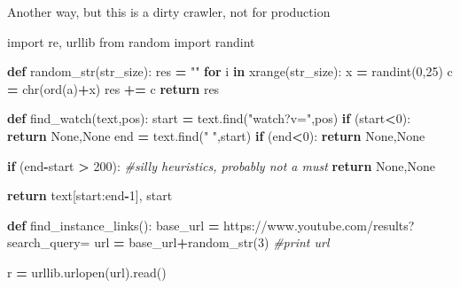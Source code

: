 \documentclass[
]{book}
\newenvironment{Shaded}{\begin{snugshade}}{\end{snugshade}}
\newcommand{\BuiltInTok}[1]{#1}
\newcommand{\CommentTok}[1]{\textcolor[rgb]{0.56,0.35,0.01}{\textit{#1}}}
\newcommand{\ControlFlowTok}[1]{\textcolor[rgb]{0.13,0.29,0.53}{\textbf{#1}}}
\newcommand{\DecValTok}[1]{\textcolor[rgb]{0.00,0.00,0.81}{#1}}
\newcommand{\ImportTok}[1]{#1}
\newcommand{\KeywordTok}[1]{\textcolor[rgb]{0.13,0.29,0.53}{\textbf{#1}}}
\newcommand{\NormalTok}[1]{#1}
\newcommand{\OperatorTok}[1]{\textcolor[rgb]{0.81,0.36,0.00}{\textbf{#1}}}
\newcommand{\StringTok}[1]{\textcolor[rgb]{0.31,0.60,0.02}{#1}}
\newcommand{\VariableTok}[1]{\textcolor[rgb]{0.00,0.00,0.00}{#1}}
\begin{document}
Another way, but this is a dirty crawler, not for production

\begin{Shaded}
\begin{Highlighting}[]
\ImportTok{import}\NormalTok{ re, urllib}
\ImportTok{from}\NormalTok{ random }\ImportTok{import}\NormalTok{ randint}

\KeywordTok{def}\NormalTok{ random\_str(str\_size):}
\NormalTok{    res }\OperatorTok{=} \StringTok{""}
    \ControlFlowTok{for}\NormalTok{ i }\KeywordTok{in} \BuiltInTok{xrange}\NormalTok{(str\_size):}
\NormalTok{        x }\OperatorTok{=}\NormalTok{ randint(}\DecValTok{0}\NormalTok{,}\DecValTok{25}\NormalTok{)}
\NormalTok{        c }\OperatorTok{=} \BuiltInTok{chr}\NormalTok{(}\BuiltInTok{ord}\NormalTok{(}\StringTok{\textquotesingle{}a\textquotesingle{}}\NormalTok{)}\OperatorTok{+}\NormalTok{x)}
\NormalTok{        res }\OperatorTok{+=}\NormalTok{ c}
    \ControlFlowTok{return}\NormalTok{ res}

\KeywordTok{def}\NormalTok{ find\_watch(text,pos):}
\NormalTok{    start }\OperatorTok{=}\NormalTok{ text.find(}\StringTok{"watch?v="}\NormalTok{,pos)}
    \ControlFlowTok{if}\NormalTok{ (start}\OperatorTok{\textless{}}\DecValTok{0}\NormalTok{):}
        \ControlFlowTok{return} \VariableTok{None}\NormalTok{,}\VariableTok{None}
\NormalTok{    end }\OperatorTok{=}\NormalTok{ text.find(}\StringTok{" "}\NormalTok{,start)}
    \ControlFlowTok{if}\NormalTok{ (end}\OperatorTok{\textless{}}\DecValTok{0}\NormalTok{):}
        \ControlFlowTok{return} \VariableTok{None}\NormalTok{,}\VariableTok{None}

    \ControlFlowTok{if}\NormalTok{ (end}\OperatorTok{{-}}\NormalTok{start }\OperatorTok{\textgreater{}} \DecValTok{200}\NormalTok{): }\CommentTok{\#silly heuristics, probably not a must}
        \ControlFlowTok{return} \VariableTok{None}\NormalTok{,}\VariableTok{None}

    \ControlFlowTok{return}\NormalTok{ text[start:end}\OperatorTok{{-}}\DecValTok{1}\NormalTok{], start}


\KeywordTok{def}\NormalTok{ find\_instance\_links():}
\NormalTok{    base\_url }\OperatorTok{=} \StringTok{\textquotesingle{}https://www.youtube.com/results?search\_query=\textquotesingle{}}
\NormalTok{    url }\OperatorTok{=}\NormalTok{ base\_url}\OperatorTok{+}\NormalTok{random\_str(}\DecValTok{3}\NormalTok{)}
    \CommentTok{\#print url}

\NormalTok{    r }\OperatorTok{=}\NormalTok{ urllib.urlopen(url).read()}


\end{Highlighting}
\end{Shaded}
\end{document}
